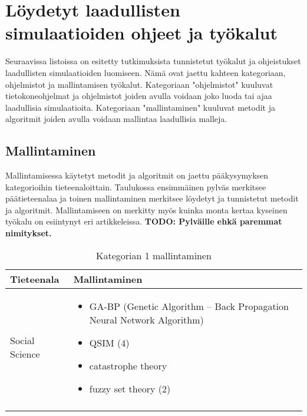 \documentclass[utf8]{gradu3}
\begin{document}
\section{Löydetyt laadullisten simulaatioiden ohjeet ja työkalut} \label{tyokalut}
Seuraavissa listoissa on esitetty tutkimuksista tunnistetut työkalut ja ohjeistukset laadullisten simulaatioiden luomiseen. Nämä ovat jaettu kahteen kategoriaan, ohjelmistot ja mallintamisen työkalut. Kategoriaan "ohjelmistot" kuuluvat tietokoneohjelmat ja ohjelmistot joiden avulla voidaan joko luoda tai ajaa laadullisia simulaatioita.
Kategoriaan "mallintaminen" kuuluvat metodit ja algoritmit joiden avulla voidaan mallintaa laadullisia malleja.

\subsection{Mallintaminen}
Mallintamisessa käytetyt metodit ja algoritmit on jaettu pääkysymyksen
kategorioihin tieteenaloittain. Taulukossa ensimmäinen pylväs merkitsee
päätieteenalaa  ja toinen mallintaminen merkitsee löydetyt ja tunnistetut 
metodit ja algoritmit. Mallintamiseen on merkitty myös 
kuinka monta kertaa kyseinen työkalu on esiintynyt eri artikkeleissa.
\textbf{TODO: Pylväille ehkä paremmat nimitykset.}

\begin{longtable}[h]{|p{5cm}|p{8cm}|}
    \hline
    \textbf{Tieteenala}    &    \textbf{Mallintaminen}\\
    \hline
    Social Science & \begin{itemize}
        \item GA-BP (Genetic Algorithm – Back Propagation Neural Network Algorithm)
        \item QSIM (4)
        \item catastrophe theory
        \item fuzzy set theory (2)
    \end{itemize} \\
    \hline
    \caption{Kategorian 1 mallintaminen}
    \label{table:Kategorian 1 mallintaminen}
\end{longtable}
\end{document}
